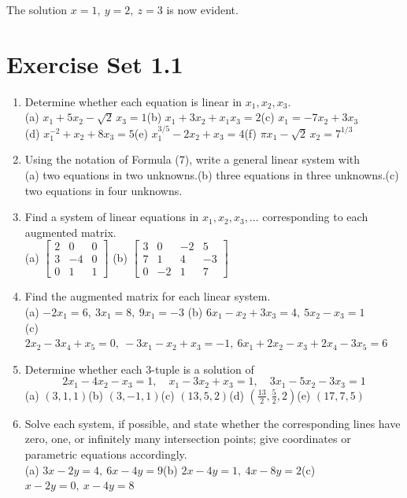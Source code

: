 \documentclass{article}
\theoremstyle{mystyle}
\begin{document}
\noindent The solution $x=1,\ y=2,\ z=3$ is now evident.

\section*{Exercise Set 1.1}
\begin{enumerate}
    \item[1.] Determine whether each equation is linear in $x_1, x_2, x_3$.\\
    (a) $x_1+5x_2-\sqrt2\,x_3=1$\quad (b) $x_1+3x_2+x_1x_3=2$\quad (c) $x_1=-7x_2+3x_3$\\
    (d) $x_1^{-2}+x_2+8x_3=5$\quad (e) $x_1^{3/5}-2x_2+x_3=4$\quad (f) $\pi x_1-\sqrt2\,x_2=7^{1/3}$

    \item[3.] Using the notation of Formula (7), write a general linear system with\\
    (a) two equations in two unknowns.\quad (b) three equations in three unknowns.\quad (c) two equations in four unknowns.

    \item[5.] Find a system of linear equations in $x_1,x_2,x_3,\dots$ corresponding to each augmented matrix.\\
    (a) $\begin{bmatrix}2&0&0\\3&-4&0\\0&1&1\end{bmatrix}$\qquad
    (b) $\begin{bmatrix}3&0&-2&5\\7&1&4&-3\\0&-2&1&7\end{bmatrix}$

    \item[7.] Find the augmented matrix for each linear system.\\
    (a) $-2x_1=6,\ 3x_1=8,\ 9x_1=-3$\qquad
    (b) $6x_1-x_2+3x_3=4,\ 5x_2-x_3=1$\\
    (c) $2x_2-3x_4+x_5=0,\ -3x_1-x_2+x_3=-1,\ 6x_1+2x_2-x_3+2x_4-3x_5=6$

    \item[9.] Determine whether each 3-tuple is a solution of
    \[
    2x_1-4x_2-x_3=1,\quad x_1-3x_2+x_3=1,\quad 3x_1-5x_2-3x_3=1
    \]
    (a) $(3,1,1)$\quad (b) $(3,-1,1)$\quad (c) $(13,5,2)$\quad (d) $\left(\tfrac{13}2,\tfrac52,2\right)$\quad (e) $(17,7,5)$

    \item[11.] Solve each system, if possible, and state whether the corresponding lines have zero, one, or infinitely many intersection points; give coordinates or parametric equations accordingly.\\
    (a) $3x-2y=4,\ 6x-4y=9$\qquad (b) $2x-4y=1,\ 4x-8y=2$\qquad (c) $x-2y=0,\ x-4y=8$


\end{enumerate}
\end{document}
